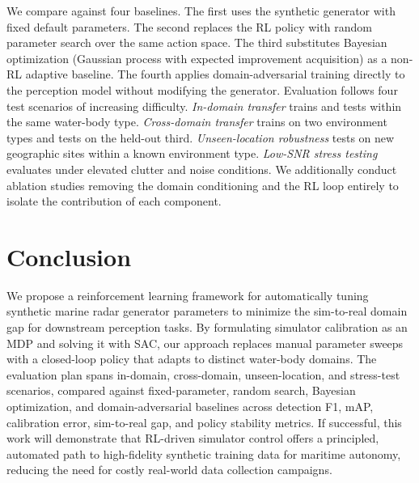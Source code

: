 \documentclass[12pt]{article}
\begin{document}
We compare against four baselines. The first uses the synthetic generator with fixed default parameters. The second replaces the RL policy with random parameter search over the same action space. The third substitutes Bayesian optimization (Gaussian process with expected improvement acquisition) as a non-RL adaptive baseline. The fourth applies domain-adversarial training \citep{Ganin2016DomainAdversarial} directly to the perception model without modifying the generator. Evaluation follows four test scenarios of increasing difficulty. \textit{In-domain transfer} trains and tests within the same water-body type. \textit{Cross-domain transfer} trains on two environment types and tests on the held-out third. \textit{Unseen-location robustness} tests on new geographic sites within a known environment type. \textit{Low-SNR stress testing} evaluates under elevated clutter and noise conditions. We additionally conduct ablation studies removing the domain conditioning and the RL loop entirely to isolate the contribution of each component.

\section{Conclusion}

We propose a reinforcement learning framework for automatically tuning synthetic marine radar generator parameters to minimize the sim-to-real domain gap for downstream perception tasks. By formulating simulator calibration as an MDP and solving it with SAC, our approach replaces manual parameter sweeps with a closed-loop policy that adapts to distinct water-body domains. The evaluation plan spans in-domain, cross-domain, unseen-location, and stress-test scenarios, compared against fixed-parameter, random search, Bayesian optimization, and domain-adversarial baselines across detection F1, mAP, calibration error, sim-to-real gap, and policy stability metrics. If successful, this work will demonstrate that RL-driven simulator control offers a principled, automated path to high-fidelity synthetic training data for maritime autonomy, reducing the need for costly real-world data collection campaigns.


\nocite{*}
\end{document}

